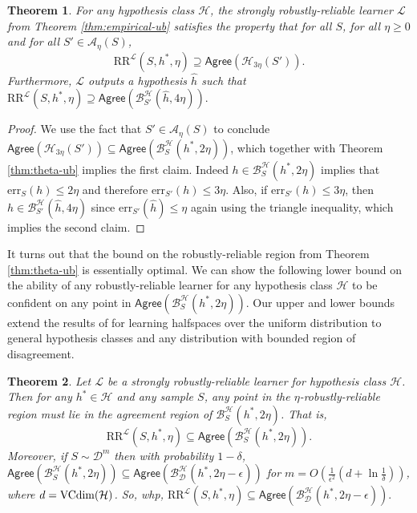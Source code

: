 \documentclass[11pt]{article}
\newcommand{\CR}{\text{RR}}
\newcommand{\err}{\mathrm{err}}
\newtheorem{theorem}{Theorem}[section]
\newcommand{\0}{\mathbf{0}}
\newcommand{\1}{\mathbf{1}}
\newcommand{\cA}{\mathcal{A}}
\newcommand{\cB}{\mathcal{B}}
\newcommand{\cD}{\mathcal{D}}
\newcommand{\cH}{\mathcal{H}}
\newcommand{\cL}{\mathcal{L}}
\newcommand{\Agree}{\mathsf{Agree}}
\begin{document}
\begin{theorem}\label{thm:theta-ub-empirical}
For any hypothesis class $\cH$, the strongly robustly-reliable learner $\cL$ from Theorem \ref{thm:empirical-ub} satisfies the property that for all $S$, for all $\eta\geq 0$ and for all $S'\in\cA_\eta(S)$,
$$\CR^\cL(S,h^*,\eta) \supseteq \Agree(\cH_{3\eta}(S')).$$
Furthermore, $\cL$ outputs a hypothesis $\hat{h}$ such that
$\CR^\cL(S,h^*,\eta) \supseteq \Agree\left(\cB_{S'}^\cH(\hat{h},4\eta)\right).$
\end{theorem}
\begin{proof} We use the fact that $S'\in\cA_\eta(S)$ to conclude $\Agree(\cH_{3\eta}(S'))\subseteq \Agree\left(\cB_S^\cH(h^*,2\eta)\right)$, which together with Theorem \ref{thm:theta-ub} implies the first claim. Indeed $h\in\cB_S^\cH(h^*,2\eta)$ implies that $\err_{S}(h)\le 2\eta$ and therefore $\err_{S'}(h)\le 3\eta$. Also, if $\err_{S'}(h)\le 3\eta$, then $h\in\cB_{S'}^\cH(\hat{h},4\eta)$ since $\err_{S'}(\hat{h})\le \eta$ again using the triangle inequality, which implies the second claim.
\end{proof}



It turns out that the bound on the robustly-reliable region from Theorem \ref{thm:theta-ub} is essentially optimal. We can show the following lower bound on the ability of any robustly-reliable learner for any hypothesis class $\cH$ to be confident on any point in $\Agree(\cB_S^{\cH}(h^*,2\eta))$. Our upper and lower bounds extend the results of \cite{gao2021learning} for learning halfspaces over the uniform distribution to general hypothesis classes and any distribution with bounded region of disagreement.



\begin{theorem}
Let $\cL$ be a strongly robustly-reliable learner for hypothesis class $\cH$.  Then for any $h^* \in \cH$ and any sample $S$, any point in the $\eta$-robustly-reliable region must lie in the agreement region of $\cB_S^\cH(h^*,2\eta)$. That is,
$$\CR^\cL(S,h^*,\eta) \subseteq \Agree\left(\cB_S^\cH(h^*,2\eta)\right).$$
Moreover, if $S\sim \cD^m$ then with probability $1-\delta$, $\Agree(\cB_S^\cH(h^*,2\eta)) \subseteq \Agree(\cB_\cD^\cH(h^*,2\eta-\epsilon))$ for $m=O(\frac{1}{\epsilon^2}(d+\ln\frac{1}{\delta}))$, where $d = {\rm VCdim}(\cH)$. So, whp, $\CR^\cL(S,h^*,\eta) \subseteq \Agree(\cB_\cD^\cH(h^*,2\eta-\epsilon)).$
\label{thm:strongly_robustly-reliable_lower_bound}
\end{theorem}
\end{document}
